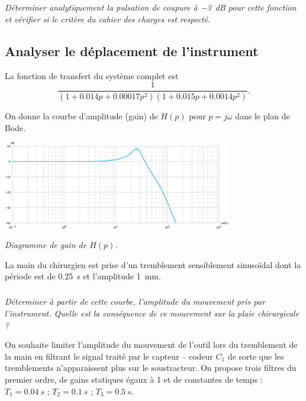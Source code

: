 \documentclass[10pt,fleqn]{article} %
\begin{document}
\subparagraph{}\textit{Déterminer analytiquement la pulsation de coupure à \SI{-3}{dB} pour cette fonction et vérifier si le critère du cahier des charges est respecté.}

\subsection{Analyser le déplacement de l'instrument \\}

La fonction de transfert du système complet est 
$$\frac{1}{(1+\num{0,014} p+\num{0,00017} p^2)(1+\num{0,015} p+\num{0,0014} p^2)}.$$

On donne la courbe d'amplitude (gain) de $H(p)$ pour
$p = j\omega$ dans le plan de Bode.


\begin{center}
	\includegraphics[width=10cm]{images2/bode_2}

\textit{Diagramme de gain de $H(p)$.}
\end{center}
%

La main du chirurgien est prise d'un tremblement sensiblement sinusoïdal dont la période est de \SI{0,25}{s} et l'amplitude \SI{1}{mm}.


\subparagraph{}\textit{Déterminer à partir de cette courbe, l'amplitude du mouvement pris par l'instrument. Quelle est la conséquence de ce mouvement sur la plaie chirurgicale ?}


On souhaite limiter l'amplitude du mouvement de l'outil lors du tremblement de la main en filtrant le signal traité par le capteur -- codeur $C_1$ de sorte que les tremblements n'apparaissent plus sur le soustracteur. On propose trois filtres du premier ordre, de gains statiques égaux à 1 et de constantes de temps : $T_1 =\SI{0,04}{s}$ ; $T_2 = \SI{0,1}{s}$ ; $T_3 = \SI{0,5}{s}$.
\end{document}
